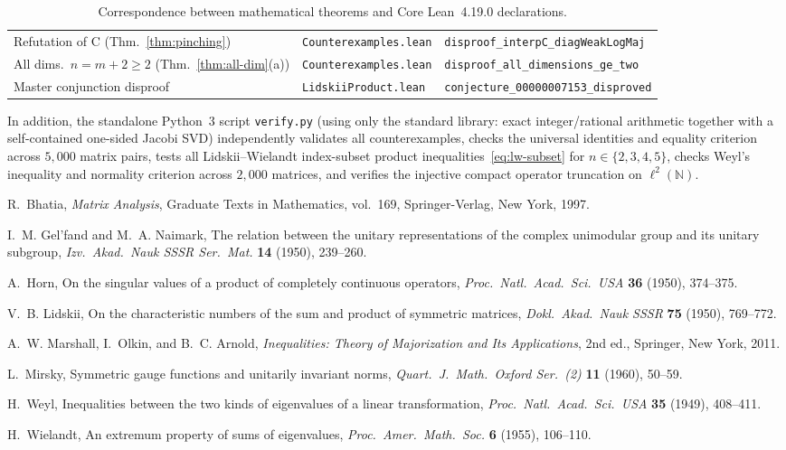 \documentclass[11pt,a4paper]{article}
\theoremstyle{definition}
\newcommand{\N}{\mathbb{N}}
\begin{document}
\begin{table}[ht]
\begin{tabular}{@{}lll@{}}
Refutation of C (Thm.~\ref{thm:pinching}) & \texttt{Counterexamples.lean} & \texttt{disproof\_interpC\_diagWeakLogMaj} \\
All dims.\ $n = m + 2 \ge 2$ (Thm.~\ref{thm:all-dim}(a)) & \texttt{Counterexamples.lean} & \texttt{disproof\_all\_dimensions\_ge\_two} \\
Master conjunction disproof & \texttt{LidskiiProduct.lean} & \texttt{conjecture\_00000007153\_disproved} \\
\bottomrule
\end{tabular}
\caption{Correspondence between mathematical theorems and Core Lean~4.19.0 declarations.}
\label{tab:lean-map}
\end{table}

In addition, the standalone Python~3 script \texttt{verify.py} (using only the standard library: exact integer/rational arithmetic together with a self-contained one-sided Jacobi SVD) independently validates all counterexamples, checks the universal identities and equality criterion across $5{,}000$ matrix pairs, tests all Lidskii--Wielandt index-subset product inequalities~\eqref{eq:lw-subset} for $n \in \{2, 3, 4, 5\}$, checks Weyl's inequality and normality criterion across $2{,}000$ matrices, and verifies the injective compact operator truncation on $\ell^2(\N)$.

\begin{thebibliography}{9}

R.~Bhatia, \emph{Matrix Analysis}, Graduate Texts in Mathematics, vol.~169, Springer-Verlag, New York, 1997.

I.~M. Gel'fand and M.~A. Naimark, The relation between the unitary representations of the complex unimodular group and its unitary subgroup, \emph{Izv.\ Akad.\ Nauk SSSR Ser.\ Mat.} \textbf{14} (1950), 239--260.

A.~Horn, On the singular values of a product of completely continuous operators, \emph{Proc.\ Natl.\ Acad.\ Sci.\ USA} \textbf{36} (1950), 374--375.

V.~B. Lidskii, On the characteristic numbers of the sum and product of symmetric matrices, \emph{Dokl.\ Akad.\ Nauk SSSR} \textbf{75} (1950), 769--772.

A.~W. Marshall, I.~Olkin, and B.~C. Arnold, \emph{Inequalities: Theory of Majorization and Its Applications}, 2nd ed., Springer, New York, 2011.

L.~Mirsky, Symmetric gauge functions and unitarily invariant norms, \emph{Quart.\ J.\ Math.\ Oxford Ser.~(2)} \textbf{11} (1960), 50--59.

H.~Weyl, Inequalities between the two kinds of eigenvalues of a linear transformation, \emph{Proc.\ Natl.\ Acad.\ Sci.\ USA} \textbf{35} (1949), 408--411.

H.~Wielandt, An extremum property of sums of eigenvalues, \emph{Proc.\ Amer.\ Math.\ Soc.} \textbf{6} (1955), 106--110.

\end{thebibliography}
\end{document}
